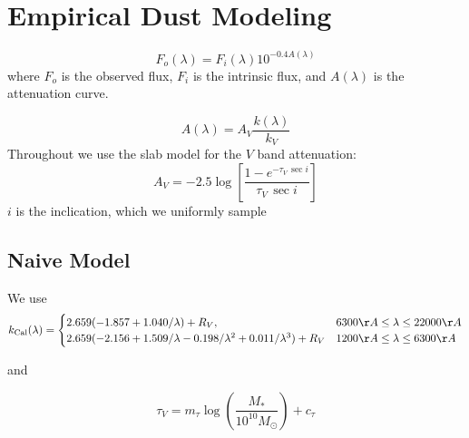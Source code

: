 \section{Empirical Dust Modeling} \label{sec:methods}

\begin{equation} 
    F_o (\lambda) = F_i (\lambda) 10^{-0.4 A(\lambda)}
\end{equation}
where $F_o$ is the observed flux, $F_i$ is the intrinsic flux, and $A(\lambda)$
is the attenuation curve. 


\begin{equation} 
    A(\lambda) = A_V \frac{k(\lambda)}{k_V} 
\end{equation}
Throughout we use the slab model \citep{somerville1999} for the $V$ band
attenuation:  
\begin{equation} 
    A_V = -2.5 \log \left[ \frac{1 - e^{-\tau_V\,\sec i}}{\tau_V\,\sec i} \right]
\end{equation}
$i$ is the inclication, which we uniformly sample 

\subsection{Naive Model} 
We use \cite{calzetti2001} 
\[
    k_{\rm Cal}(\lambda) = 
    \begin{cases} 
        2.659 (-1.857 + 1.040/\lambda) + R_V, & 6300 \AA \le \lambda \le
        22000 \AA \\ 
        2.659 (-2.156 + 1.509/\lambda - 0.198/\lambda^2 + 0.011/\lambda^3) +
        R_V & 1200 \AA \le \lambda \le 6300 \AA
    \end{cases}
\]

and 

\begin{equation}
    \tau_V = m_\tau \log \left(\frac{M_*}{10^{10} M_\odot}\right) + c_\tau
\end{equation} 


